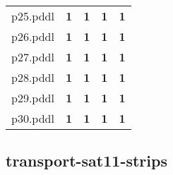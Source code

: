 \documentclass{article}
\begin{document}
\begin{tabular}{@{}lrrrr@{}}
p25.pddl & \textbf{1} & \textbf{1} & \textbf{1} & \textbf{1} \\
p26.pddl & \textbf{1} & \textbf{1} & \textbf{1} & \textbf{1} \\
p27.pddl & \textbf{1} & \textbf{1} & \textbf{1} & \textbf{1} \\
p28.pddl & \textbf{1} & \textbf{1} & \textbf{1} & \textbf{1} \\
p29.pddl & \textbf{1} & \textbf{1} & \textbf{1} & \textbf{1} \\
p30.pddl & \textbf{1} & \textbf{1} & \textbf{1} & \textbf{1} \\
\end{tabular}

\hypertarget{coverage-transport-sat11-strips}{}
\subsection*{transport-sat11-strips}
\end{document}
